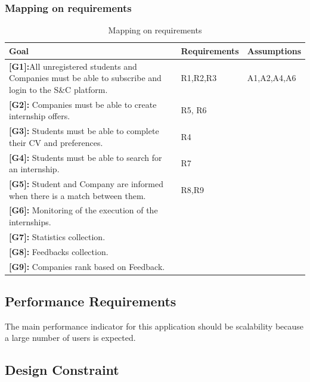 \subsubsection{Mapping on requirements}

\begin{table}[H]
\renewcommand\arraystretch{1.5}
    \centering
    \begin{tabular}{p{10cm}ll}
    \rowcolor{BurntOrange}
        \textbf{Goal}&  \textbf{Requirements}& \textbf{Assumptions}\\
    \hline
    \textbf{[G1]:}All unregistered students and Companies must be able to subscribe and login to the S\&C platform. & R1,R2,R3 & A1,A2,A4,A6\\
    \hline
    \textbf{[G2]:} Companies must be able to create internship offers.& R5, R6 & \\
    \hline
    \textbf{[G3]:} Students must be able to complete their CV and preferences.& R4 & \\
    \hline
    \textbf{[G4]:} Students must be able to search for an internship.& R7 & \\
    \hline
    \textbf{[G5]:} Student and Company are informed when there is a match between them.
    & R8,R9 & \\
    \hline
    \textbf{[G6]:} Monitoring of the execution of the internships.& & \\
    \hline
    \textbf{[G7]:} Statistics collection.& & \\
    \hline
    \textbf{[G8]:} Feedbacks collection.& & \\
    \hline
    \textbf{[G9]:} Companies rank based on Feedback.& & \\
    \hline
    \end{tabular}
    \caption{Mapping on requirements}
    \label{Mapping on requirements}
\end{table}

\subsection{Performance Requirements}
The main performance indicator for this application should be scalability because a large number of users is expected.

\subsection{Design Constraint}
